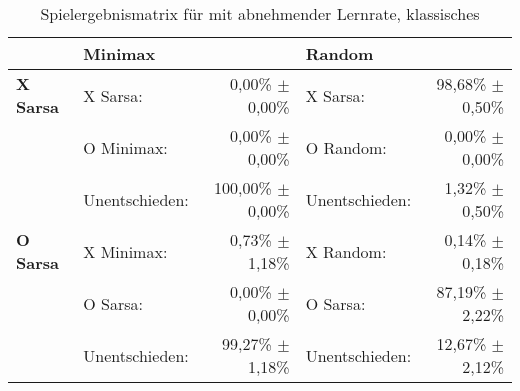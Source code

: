 \begin{table}
\centering
\caption[Spielergebnismatrix \sarsa: abnehmende Lernrate, klassisches \splay]{Spielergebnismatrix für \sarsa mit abnehmender Lernrate, klassisches \splay}

\begin{tabular}{llrlr}
\toprule
 & \multicolumn{2}{l}{\textbf{Minimax}} & \multicolumn{2}{l}{\textbf{Random}} \\ \midrule
\textbf{X Sarsa}        & X Sarsa:          & 0,00\% $\pm$    0,00\%            & X Sarsa:              & 98,68\% $\pm$ 0,50\%  \\
                        & O Minimax:        & 0,00\% $\pm$    0,00\%            & O Random:             & 0,00\% $\pm$  0,00\%  \\
                        & Unentschieden:    & 100,00\% $\pm$  0,00\%            & Unentschieden:        & 1,32\% $\pm$  0,50\%  \\ \cmidrule{2-5}
\textbf{O Sarsa}        & X Minimax:        & 0,73\% $\pm$    1,18\%            & X Random:             & 0,14\% $\pm$ 0,18\%  \\
                        & O Sarsa:          & 0,00\% $\pm$    0,00\%            & O Sarsa:              & 87,19\% $\pm$ 2,22\%  \\
                        & Unentschieden:    & 99,27\% $\pm$   1,18\%            & Unentschieden:        & 12,67\% $\pm$ 2,12\%  \\ \bottomrule
\end{tabular}
\end{table}